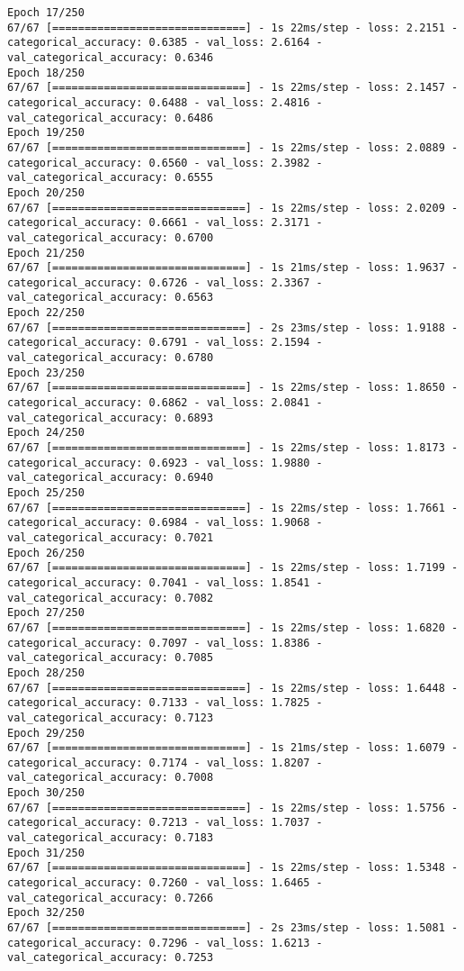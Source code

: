\begin{lstlisting}
Epoch 17/250
67/67 [==============================] - 1s 22ms/step - loss: 2.2151 - categorical_accuracy: 0.6385 - val_loss: 2.6164 - val_categorical_accuracy: 0.6346
Epoch 18/250
67/67 [==============================] - 1s 22ms/step - loss: 2.1457 - categorical_accuracy: 0.6488 - val_loss: 2.4816 - val_categorical_accuracy: 0.6486
Epoch 19/250
67/67 [==============================] - 1s 22ms/step - loss: 2.0889 - categorical_accuracy: 0.6560 - val_loss: 2.3982 - val_categorical_accuracy: 0.6555
Epoch 20/250
67/67 [==============================] - 1s 22ms/step - loss: 2.0209 - categorical_accuracy: 0.6661 - val_loss: 2.3171 - val_categorical_accuracy: 0.6700
Epoch 21/250
67/67 [==============================] - 1s 21ms/step - loss: 1.9637 - categorical_accuracy: 0.6726 - val_loss: 2.3367 - val_categorical_accuracy: 0.6563
Epoch 22/250
67/67 [==============================] - 2s 23ms/step - loss: 1.9188 - categorical_accuracy: 0.6791 - val_loss: 2.1594 - val_categorical_accuracy: 0.6780
Epoch 23/250
67/67 [==============================] - 1s 22ms/step - loss: 1.8650 - categorical_accuracy: 0.6862 - val_loss: 2.0841 - val_categorical_accuracy: 0.6893
Epoch 24/250
67/67 [==============================] - 1s 22ms/step - loss: 1.8173 - categorical_accuracy: 0.6923 - val_loss: 1.9880 - val_categorical_accuracy: 0.6940
Epoch 25/250
67/67 [==============================] - 1s 22ms/step - loss: 1.7661 - categorical_accuracy: 0.6984 - val_loss: 1.9068 - val_categorical_accuracy: 0.7021
Epoch 26/250
67/67 [==============================] - 1s 22ms/step - loss: 1.7199 - categorical_accuracy: 0.7041 - val_loss: 1.8541 - val_categorical_accuracy: 0.7082
Epoch 27/250
67/67 [==============================] - 1s 22ms/step - loss: 1.6820 - categorical_accuracy: 0.7097 - val_loss: 1.8386 - val_categorical_accuracy: 0.7085
Epoch 28/250
67/67 [==============================] - 1s 22ms/step - loss: 1.6448 - categorical_accuracy: 0.7133 - val_loss: 1.7825 - val_categorical_accuracy: 0.7123
Epoch 29/250
67/67 [==============================] - 1s 21ms/step - loss: 1.6079 - categorical_accuracy: 0.7174 - val_loss: 1.8207 - val_categorical_accuracy: 0.7008
Epoch 30/250
67/67 [==============================] - 1s 22ms/step - loss: 1.5756 - categorical_accuracy: 0.7213 - val_loss: 1.7037 - val_categorical_accuracy: 0.7183
Epoch 31/250
67/67 [==============================] - 1s 22ms/step - loss: 1.5348 - categorical_accuracy: 0.7260 - val_loss: 1.6465 - val_categorical_accuracy: 0.7266
Epoch 32/250
67/67 [==============================] - 2s 23ms/step - loss: 1.5081 - categorical_accuracy: 0.7296 - val_loss: 1.6213 - val_categorical_accuracy: 0.7253

\end{lstlisting}
